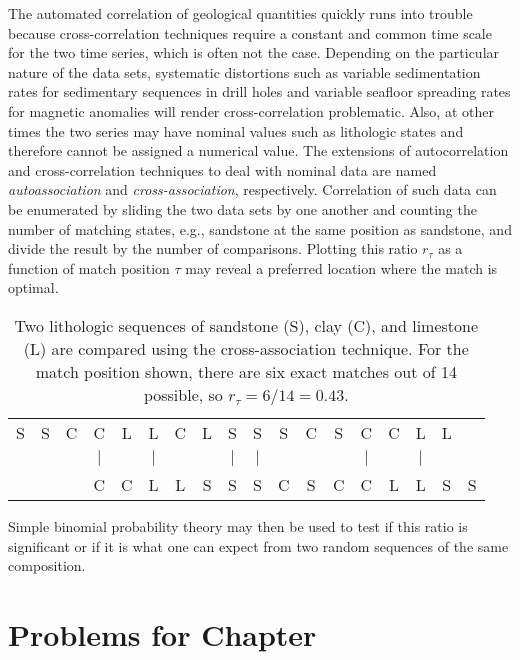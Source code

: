 	The automated correlation of geological quantities quickly runs into trouble because
cross-correlation techniques require a constant and common time scale for the two time series, which is 
often not the case.  Depending on the particular nature of the data sets, systematic 
distortions such as variable sedimentation rates for sedimentary sequences in drill holes and variable 
seafloor spreading rates for magnetic anomalies will render cross-correlation problematic.  Also, at other times the 
two series may have nominal values such as lithologic states and therefore cannot be assigned a numerical 
value.  The extensions of autocorrelation and cross-correlation techniques to deal with nominal 
data are named \emph{autoassociation} and \emph{cross-association}, respectively.
Correlation of such data can be enumerated by sliding
the two data sets by one another and counting the number of matching states, e.g., 
sandstone at the same position as sandstone, and divide the result by the number of comparisons.  
Plotting this ratio $r_\tau$ as a function of match position $\tau$ may reveal a preferred location where the 
match is optimal.  
\begin{table}[h]
\center
\begin{tabular}{cccccccccccccccccc}
S & S & C & C   & L &  L  & C & L &  S  &  S  & S & C & S &  C &  C &  L  & L & \\
  &   &   & $|$ &   & $|$ &   &   & $|$ & $|$ &   &   &   & $|$ &   & $|$ &   &  \\   
  &   &   & C   & C &  L  & L & S &  S  &  S  & C & S & C &  C &  L &  L  & S & S  \\
\end{tabular}
\label{tbl:cross_assoc}
\caption{Two lithologic sequences of sandstone (S), clay (C), and limestone (L) are compared using the cross-association 
technique.  For the match position shown, there are six exact matches out of 14 possible, so $r_\tau = 6/14 = 0.43$.}
\end{table}

Simple binomial probability theory may then be used to test if this ratio is significant or if it is what one can 
expect from two random sequences of the same composition.

\clearpage
\section{Problems for Chapter \thechapter}

